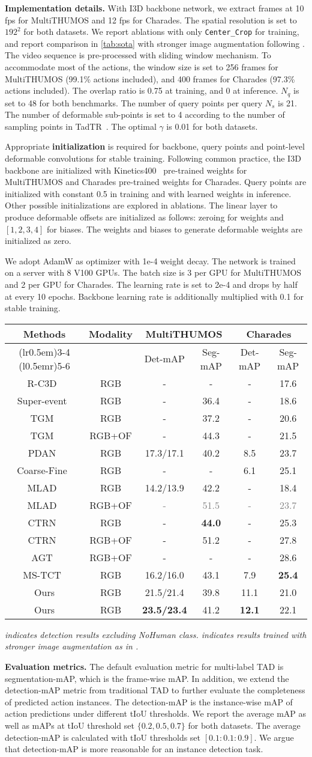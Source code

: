 \documentclass{article}
\renewcommand{\paragraph}[1]{\vspace{1.25mm}\noindent\textbf{#1}}
\newcommand{\headrule}{\toprule}
\newcommand{\TableSOTA}{
\begin{table*}[t]
\begin{threeparttable}
\centering
\small
    \renewcommand\arraystretch{0.9}
    \setlength{\tabcolsep}{13pt}
    \caption{\textbf{Comparison with the state of the art} on the MultiTHUMOS test set and Charades test set, under detection-mAP (\%) and segmentation-mAP(\%).}
\begin{tabular}{cccccc}
\headrule
\multirow{2}{*}{{Methods}}& \multirow{2}{*}{Modality}  & \multicolumn{2}{c}{MultiTHUMOS}               & \multicolumn{2}{c}{Charades} \\ \cmidrule(lr{0.5em}){3-4} \cmidrule(l{0.5em}r){5-6} 
\multicolumn{1}{c}{} & \multicolumn{1}{c}{} & Det-mAP & \multicolumn{1}{c}{Seg-mAP} & Det-mAP   & Seg-mAP  \\ 
\midrule
R-C3D~\cite{DBLP:conf/iccv/XuDS17}  & RGB & -       & -         & -        & {17.6}      \\
Super-event~\cite{DBLP:conf/cvpr/PiergiovanniR18}& RGB & -   & 36.4           & -        & 18.6       \\
TGM~\cite{DBLP:conf/icml/PiergiovanniR19}   & RGB & -         & 37.2         & -        & 20.6       \\
{\color{gray}TGM~\cite{DBLP:conf/icml/PiergiovanniR19} }  & {\color{gray}RGB+OF} & {\color{gray}-} & {\color{gray}44.3}  & {\color{gray}-} & {\color{gray}21.5}    \\
PDAN~\cite{DBLP:conf/wacv/DaiDMGFB21}& RGB &{17.3/17.1\footnotemark[3]}  & 40.2 & {8.5} & 23.7 \\
Coarse-Fine~\cite{DBLP:conf/cvpr/KahatapitiyaR21}  & RGB  & -  & -  & {6.1}   & 25.1   \\
MLAD~\cite{DBLP:conf/cvpr/TirupatturDRS21}    & RGB & {14.2/13.9\footnotemark[3]}  & 42.2  & - & 18.4 \\
{\color{gray}MLAD~\cite{DBLP:conf/cvpr/TirupatturDRS21}} & {\color{gray}RGB+OF} & \textcolor{gray}{-}& \textcolor{gray}{51.5} & \textcolor{gray}{-} & \textcolor{gray}{23.7} \\
CTRN~\cite{DBLP:conf/bmvc/DaiDB21}  & RGB & -  & {\bf 44.0}    & -       & {25.3}       \\
{\color{gray}CTRN~\cite{DBLP:conf/bmvc/DaiDB21}}  & {\color{gray}RGB+OF} & {\color{gray}-}  & {\color{gray}51.2}    & {\color{gray}-} & {\color{gray}27.8}       \\
{\color{gray}AGT~\cite{DBLP:journals/corr/abs-2101-08540}} & {\color{gray}RGB+OF}& {\color{gray}-} & {\color{gray}-} &{\color{gray}-}& {\color{gray}28.6} \\
MS-TCT~\cite{DBLP:conf/cvpr/DaiDKRB22}  & RGB & {16.2/16.0\footnotemark[3]}        & {43.1}     & {7.9}            & {\bf 25.4}       \\
\midrule
Ours      & RGB & {{ 21.5/21.4\footnotemark[3]}}         & 39.8                           & { 11.1}           & 21.0      \\
Ours\footnotemark[4]    & RGB & {{\bf 23.5/23.4\footnotemark[3]}}         & 41.2                         & {\bf 12.1}           & 22.1     \\
\bottomrule
\end{tabular}
\label{tab:sota}
\begin{tablenotes}
\item \small{\em \footnotemark[3] indicates detection results excluding NoHuman class. \footnotemark[4]indicates results trained with stronger image augmentation as in \cite{liu2022an}.}
\vspace{-4mm}
\end{tablenotes}
\end{threeparttable}
\end{table*}
}
\begin{document}
\paragraph{Implementation details.}
\label{parag:implement_details}
With I3D backbone network, we extract frames at 10 fps for MultiTHUMOS and 12 fps for Charades. The spatial resolution is set to $192^2$ for both datasets. {We report ablations with only \texttt{Center\_Crop} for training, and report comparison in \cref{tab:sota} with stronger image augmentation following \cite{liu2022an}.} The video sequence is pre-processed with sliding window mechanism. To accommodate most of the actions, the window size is set to 256 frames for MultiTHUMOS (99.1\% actions included), and 400 frames for Charades (97.3\% actions included). The overlap ratio is 0.75 at training, and 0 at inference. $N_q$ is set to 48 for both benchmarks. The number of query points per query $N_s$ is 21. The number of deformable sub-points is set to 4 according to the number of sampling points in TadTR~\cite{DBLP:journals/corr/abs-2106-10271}.  {The optimal $\gamma$ is 0.01 for both datasets.}

Appropriate {\bf initialization} is required for backbone, query points and point-level deformable convolutions for stable training. Following common practice, the I3D backbone are initialized with Kinetics400~\cite{DBLP:journals/corr/KayCSZHVVGBNSZ17} pre-trained weights for MultiTHUMOS and Charades pre-trained weights for Charades. Query points are initialized with constant 0.5 in training and with learned weights in inference. Other possible initializations are explored in ablations. The linear layer to produce deformable offsets are initialized as follows: zeroing for weights and $[1,2,3,4]$ for biases. The weights and biases to generate deformable weights are initialized as zero. 

We adopt AdamW as optimizer with 1e-4 weight decay. The network is trained on a server with 8 V100 GPUs. {The batch size is 3 per GPU for MultiTHUMOS and 2 per GPU for Charades. The learning rate is set to 2e-4 and drops by half at every 10 epochs.} Backbone learning rate is additionally multiplied with 0.1 for stable training.

\TableSOTA

\paragraph{Evaluation metrics.}
The default evaluation metric for multi-label TAD is segmentation-mAP, which is the frame-wise mAP. In addition, we extend the detection-mAP metric from traditional TAD to further evaluate the completeness of predicted action instances. The detection-mAP is the instance-wise mAP of action predictions under different tIoU thresholds. We report the average mAP as well as mAPs at tIoU threshold set $\{0.2, 0.5, 0.7\}$ for both datasets. The average detection-mAP is calculated with tIoU thresholds set $[0.1:0.1:0.9]$. We argue that detection-mAP is more reasonable for an instance detection task. 
\end{document}
